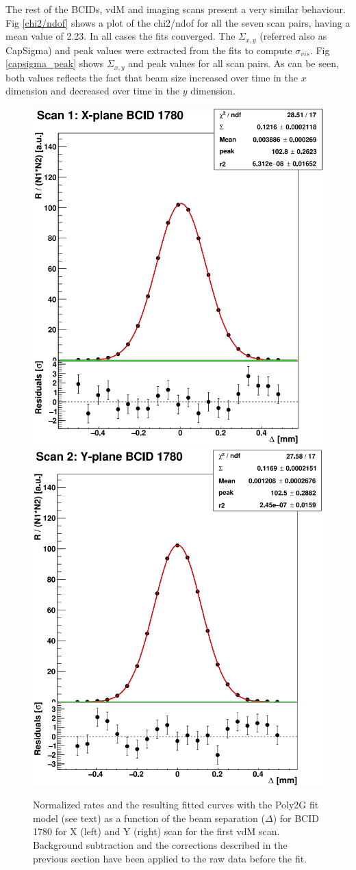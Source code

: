 The rest of the BCIDs, vdM and imaging scans present a very similar behaviour. Fig \ref{chi2/ndof} shows a plot of the chi2/ndof for all the seven scan pairs, having a mean value of 2.23. In all cases the fits converged. The $\Sigma_{x,y}$  (referred also as CapSigma) and peak values were extracted from the fits to compute $\sigma_{vis}$. Fig \ref{capsigma_peak} shows $\Sigma_{x,y}$ and peak values for all scan pairs. As can be seen, both values reflects the fact that beam size increased over time in the $x$ dimension and decreased over time in the $y$ dimension.
\begin{center}
\begin{figure}[ht]
\centering
\includegraphics[width=.38\textwidth]{Chapter4/plots/xscan.png}
\includegraphics[width=.38\textwidth]{Chapter4/plots/yscan.png}\\
\caption[vdM1 BCID 1780 (linear scale)]{Normalized rates and the resulting fitted curves with the Poly2G fit model (see text) as a function of
  the beam separation ($\Delta$) for BCID 1780 for X (left) and Y (right) scan for the first vdM scan. Background subtraction and the corrections described in the previous section have been applied to the raw data before the fit.}
\label{vdM1_1780_XYscan}
\end{figure}
\end{center}

